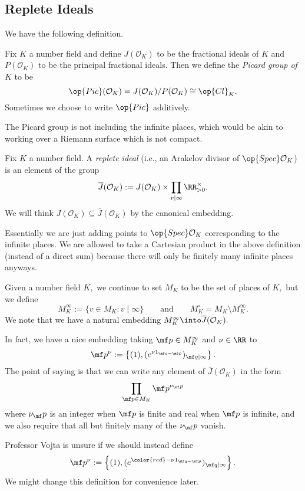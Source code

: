 \subsection{Replete Ideals}
We have the following definition.
\begin{definition}
	Fix $K$ a number field and define $J(\mathcal O_K)$ to be the fractional ideals of $K$ and $P(\mathcal O_K)$ to be the principal fractional ideals. Then we define the \textit{Picard group of $K$} to be
	\[\op{Pic}(\mathcal O_K)=J(\mathcal O_K)/P(\mathcal O_K)\cong\op{Cl}_K.\]
	Sometimes we choose to write $\op{Pic}$ additively.
\end{definition}
The Picard group is not including the infinite places, which would be akin to working over a Riemann surface which is not compact.
\begin{definition}
	Fix $K$ a number field. A \textit{replete ideal} (i.e., an Arakelov divisor of $\op{Spec}\mathcal O_K$) is an element of the group
	\[\overline J(\mathcal O_K):=J(\mathcal O_K)\times\prod_{v\mid\infty}\RR^\times_{>0}.\]
	We will think $J(\mathcal O_K)\subseteq\overline J(\mathcal O_K)$ by the canonical embedding.
\end{definition}
Essentially we are just adding points to $\op{Spec}\mathcal O_K$ corresponding to the infinite places. We are allowed to take a Cartesian product in the above definition (instead of a direct sum) because there will only be finitely many infinite places anyways.
\begin{definition}
	Given a number field $K,$ we continue to set $M_K$ to be the set of places of $K,$ but we define
	\[M_K^\infty:=\{v\in M_K:v\mid\infty\}\qquad\text{and}\qquad M_K^\circ=M_K\setminus M_K^\infty.\]
	We note that we have a natural embedding $M_K^\infty\into\overline J(\mathcal O_K).$
\end{definition}
In fact, we have a nice embedding taking $\mf p\in M_K^\infty$ and $\nu\in\RR$ to
\[\mf p^\nu:=\left\{(1),(e^{\nu1_{\mf q=\mf p}})_{\mf q\mid\infty}\right\}.\]
The point of saying is that we can write any element of $\overline J(\mathcal O_K)$ in the form
\[\prod_{\mf p\in M_K}\mf p^{\nu_\mf p}\]
where $\nu_\mf p$ is an integer when $\mf p$ is finite and real when $\mf p$ is infinite, and we also require that all but finitely many of the $\nu_\mf p$ vanish.
\begin{remark}
	Professor Vojta is unsure if we should instead define
	\[\mf p^\nu:=\left\{(1),(e^{{\color{red}-}\nu1_{\mf q=\mf p}})_{\mf q\mid\infty}\right\}.\]
	We might change this definition for convenience later.
\end{remark}
